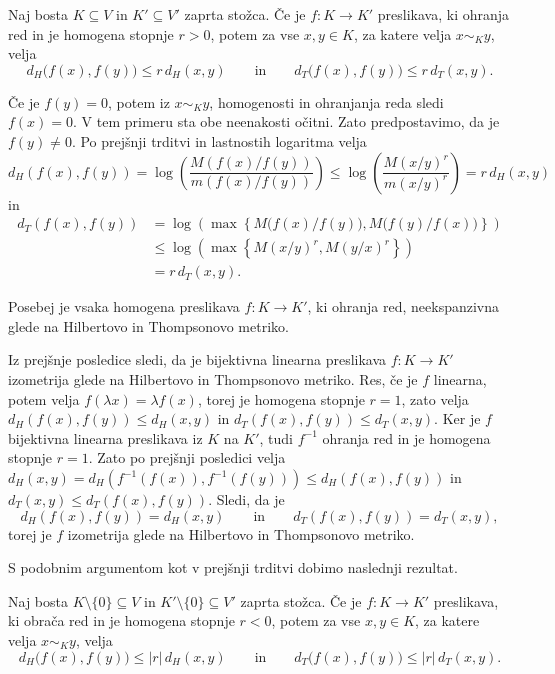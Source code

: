 \documentclass[mat2, tisk]{fmfdelo}
\begin{document}
\begin{posledica}\label{posledica3.9}
Naj bosta $K\subseteq V$ in $K'\subseteq V'$ zaprta stožca. Če je
$f:K\longrightarrow K'$ preslikava, ki ohranja red in je homogena
stopnje $r>0$, potem za vse $x,y\in K$, za katere velja $x\sim_K y$,
velja
\[
d_H\bigl(f(x),f(y)\bigr)\leq r\,d_H(x,y)
\qquad\text{in}\qquad
d_T\bigl(f(x),f(y)\bigr)\leq r\,d_T(x,y).
\]
\end{posledica}
\begin{dokaz}
  Če je $f(y)=0$, potem iz $x\sim_K y$, homogenosti
  in ohranjanja reda sledi $f(x)=0$.
  V tem primeru sta obe neenakosti očitni.
  Zato predpostavimo, da je $f(y)\neq0$.
  Po prejšnji trditvi in lastnostih logaritma velja
  \[
  d_H(f(x),f(y))=\log\left(\frac{M(f(x)/f(y))}{m(f(x)/f(y))}\right)
  \leq
  \log\left(\frac{M(x/y)^r}{m(x/y)^r}\right)
  =r\,d_H(x,y)
  \]
  in
  \[
  \begin{aligned}
    d_T(f(x),f(y))
    &=
    \log\left(
    \max\left\{
    M\bigl(f(x)/f(y)\bigr),
    M\bigl(f(y)/f(x)\bigr)
    \right\}
    \right)\\
    &\leq
    \log\left(
    \max\left\{
    M(x/y)^r,
    M(y/x)^r
    \right\}
    \right)\\
    &=
    r\,d_T(x,y).
  \end{aligned}
  \]
\end{dokaz}

Posebej je vsaka homogena preslikava $f:K\longrightarrow K'$, ki
ohranja red, neekspanzivna glede na Hilbertovo in Thompsonovo metriko.

Iz prejšnje posledice sledi, da je bijektivna linearna preslikava
$f:K\longrightarrow K'$ izometrija glede na Hilbertovo in Thompsonovo
metriko. Res, če je $f$ linearna, potem velja $f(\lambda x)=\lambda f(x)$, torej je homogena 
stopnje $r=1$, zato velja $d_H(f(x),f(y))\leq d_H(x,y)$ in $d_T(f(x),f(y))\leq d_T(x,y)$. 
Ker je $f$ bijektivna linearna preslikava iz $K$ na $K'$,
tudi $f^{-1}$ ohranja red in je homogena stopnje $r=1$.
Zato po prejšnji posledici velja 
$d_H(x,y) = d_H(f^{-1}(f(x)),f^{-1}(f(y))) \leq d_H(f(x),f(y))$ in $d_T(x,y)\leq d_T(f(x),f(y))$. Sledi, da je
\[d_H(f(x),f(y))=d_H(x,y)
\qquad\text{in}\qquad
d_T(f(x),f(y))=d_T(x,y),\]
torej je $f$ izometrija glede na Hilbertovo in Thompsonovo metriko.

S podobnim argumentom kot v prejšnji trditvi dobimo naslednji
rezultat.

\begin{posledica}
Naj bosta $K\setminus\{0\}\subseteq V$ in $K'\setminus\{0\}\subseteq V'$ zaprta stožca. Če je
$f:K\longrightarrow K'$ preslikava, ki obrača red in je homogena
stopnje $r<0$, potem za vse $x,y\in K$, za katere velja $x\sim_K y$,
velja
\[
d_H\bigl(f(x),f(y)\bigr)\leq |r|\,d_H(x,y)
\qquad\text{in}\qquad
d_T\bigl(f(x),f(y)\bigr)\leq |r|\,d_T(x,y).
\]
\end{posledica}
\end{document}
